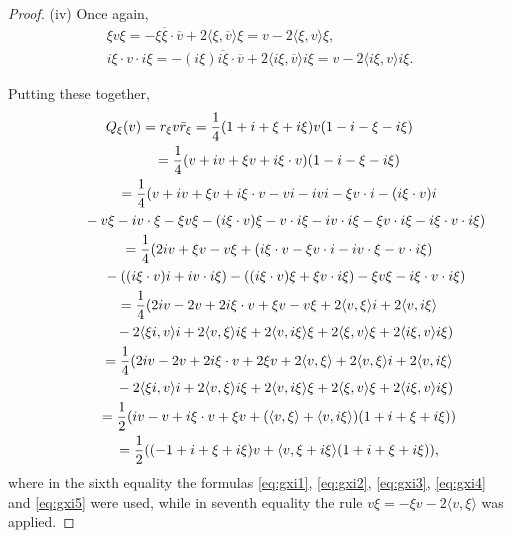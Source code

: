 \documentclass[10pt,a4paper]{amsart}
\numberwithin{equation}{section}
\begin{document}
\begin{proof}
(iv) Once again,
 \begin{gather}
 \xi v \xi =-\xi\overline{\xi}\cdot\overline{v}+2\langle\xi,\overline{v}\rangle\xi=v-2\langle\xi,v\rangle\xi, \label{eq:gxi4}\\
 i\xi \cdot v\cdot i\xi =-(i\xi)\overline{i\xi}\cdot\overline{v}+2\langle i\xi,\overline{v}\rangle i\xi=v-2\langle i\xi,v\rangle i\xi. \label{eq:gxi5}
 \end{gather}

 Putting these together,
 \begin{gather*}
 Q_\xi(v) = r_\xi v\bar{r}_\xi=\frac{1}{4}(1+i+\xi+i\xi)v(1-i-\xi-i\xi)\\
 \hphantom{Q_\xi(v)}{} = \frac{1}{4}(v+iv+\xi v+i\xi \cdot v)(1-i-\xi-i\xi)\\
\hphantom{Q_\xi(v)}{}= \frac{1}{4}(v+iv+\xi v+i\xi\cdot v -v i-ivi-\xi v\cdot i-(i\xi\cdot v)i\\
\hphantom{Q_\xi(v)=}{} -v\xi-iv\cdot\xi-\xi v\xi-(i\xi\cdot v)\xi-v\cdot i\xi-iv\cdot i\xi-\xi v\cdot i\xi-i\xi\cdot v\cdot i\xi)\\
\hphantom{Q_\xi(v)}{}= \frac{1}{4}(2iv+\xi v-v\xi+(i\xi \cdot v-\xi v \cdot i- iv\cdot \xi-v\cdot i\xi) \\
\hphantom{Q_\xi(v)=}{} -((i\xi\cdot v)i + i v \cdot i\xi )-((i\xi\cdot v)\xi+\xi v\cdot i\xi)-\xi v \xi - i\xi \cdot v \cdot i\xi)\\
\hphantom{Q_\xi(v)}{}= \frac{1}{4}(2iv-2v+2i\xi\cdot v +\xi v-v\xi +2 \langle v,\xi \rangle i+2\langle v, i\xi \rangle\\
\hphantom{Q_\xi(v)=}{} -2 \langle\xi i,v \rangle i+2 \langle v,\xi \rangle i\xi+2\langle v,i\xi \rangle \xi+ 2\langle \xi,v\rangle \xi+2 \langle i\xi,v\rangle i\xi)\\
\hphantom{Q_\xi(v)}{}= \frac{1}{4}(2iv-2v+2i\xi\cdot v +2\xi v+2 \langle v,\xi \rangle +2 \langle v,\xi \rangle i+2\langle v, i\xi \rangle\\
\hphantom{Q_\xi(v)=}{} -2 \langle\xi i,v \rangle i+2 \langle v,\xi \rangle i\xi+2\langle v,i\xi \rangle \xi+ 2\langle \xi,v\rangle \xi+2 \langle i\xi,v\rangle i\xi)\\
\hphantom{Q_\xi(v)}{}= \frac{1}{2}(iv-v+i\xi\cdot v+\xi v+ (\langle v, \xi \rangle + \langle v, i\xi \rangle )(1+i+\xi+i\xi))\\
\hphantom{Q_\xi(v)}{}= \frac{1}{2}((-1+i+\xi+i\xi) v + \langle v, \xi + i\xi \rangle (1+i+\xi+i\xi)),
 \end{gather*}
 where in the sixth equality the formulas \eqref{eq:gxi1}, \eqref{eq:gxi2}, \eqref{eq:gxi3}, \eqref{eq:gxi4} and \eqref{eq:gxi5} were used, while in seventh equality the rule $v\xi=-\xi v-2 \langle v,\xi \rangle$ was applied.
\end{proof}
\end{document}
